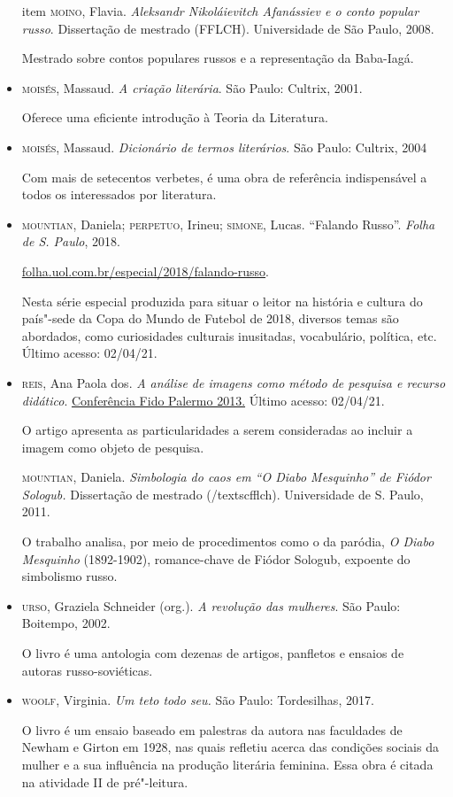 \documentclass[11pt]{extarticle}
\begin{document}
\begin{itemize}
item \textsc{moino}, Flavia. \emph{Aleksandr Nikoláievitch Afanássiev e o conto popular russo}. Dissertação de mestrado (FFLCH). Universidade de São Paulo, 2008.

Mestrado sobre contos populares russos e a representação da Baba-Iagá.

\item \textsc{moisés}, Massaud. \emph{A criação literária}. São Paulo: Cultrix, 2001.

Oferece uma eficiente introdução à Teoria da Literatura.

\item \textsc{moisés}, Massaud. \emph{Dicionário de termos literários}. São Paulo:
Cultrix, 2004

Com mais de setecentos verbetes, é uma obra de referência indispensável a todos os interessados por literatura.

\item\textsc{mountian}, Daniela; \textsc{perpetuo}, Irineu; \textsc{simone}, 
Lucas. ``Falando Russo''. \emph{Folha de S. Paulo}, 2018.

\href{https://www1.folha.uol.com.br/especial/2018/falando-russo/\#20}{folha.uol.com.br/especial/2018/falando-russo}.

Nesta série especial produzida para situar o leitor na história e
cultura do país"-sede da Copa do Mundo de Futebol de 2018, diversos temas
são abordados, como curiosidades culturais inusitadas, vocabulário,
política, etc. Último acesso: 02/04/21.

\item \textsc{reis}, Ana Paola dos. \emph{A análise de imagens como método de pesquisa e recurso didático}. 
\href{https://fido.palermo.edu/servicios_dyc/encuentro2010/administracion-concursos/archivos_conf_2013/1131_85939_1689con.pdf}{Conferência Fido Palermo 2013.} 
Último acesso: 02/04/21.

O artigo apresenta as particularidades a serem consideradas ao incluir a imagem como objeto de pesquisa.

\textsc{mountian}, Daniela. \emph{Simbologia do caos em ``O Diabo Mesquinho'' de Fiódor Sologub.} Dissertação de mestrado (/textsc{fflch}). Universidade de S. Paulo, 2011.

O trabalho analisa, por meio de procedimentos como o da paródia, \emph{O Diabo Mesquinho} (1892-1902), romance-chave de Fiódor Sologub, expoente do simbolismo russo.

\item \textsc{urso}, Graziela Schneider (org.). \emph{A revolução das mulheres}. São
Paulo: Boitempo, 2002.

O livro é uma antologia com dezenas de artigos, panfletos e ensaios de autoras russo-soviéticas.

\item \textsc{woolf}, Virginia. \emph{Um teto todo seu.} São Paulo: Tordesilhas, 2017.

O livro é um ensaio baseado em palestras da autora nas faculdades de Newham e Girton em 1928, nas quais refletiu acerca das condições sociais da mulher e a sua influência na produção literária feminina. Essa obra é citada na atividade II de pré"-leitura.
\end{itemize}
\end{document}
